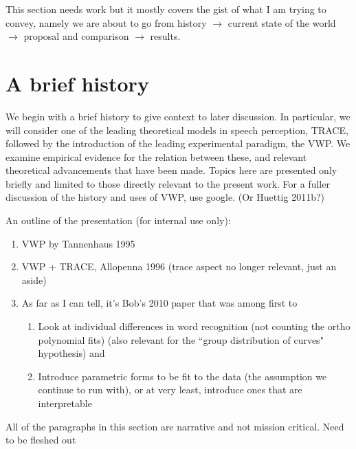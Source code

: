 This section needs work but it mostly covers the gist of what I am trying to convey, namely we are about to go from history $\rightarrow$ current state of the world $\rightarrow$ proposal and comparison $\rightarrow$ results.

\section{A brief history}
We begin with a brief history to give context to later discussion. In particular, we will consider one of the leading theoretical models in speech perception, TRACE, followed by the introduction of the leading experimental paradigm, the VWP. We examine empirical evidence for the relation between these, and relevant theoretical advancements that have been made. Topics here are presented only briefly and limited to those directly relevant to the present work. For a fuller discussion of the history and uses of VWP, use google. (Or Huettig 2011b?)

An outline of the presentation (for internal use only):

\begin{singlespace}
\begin{enumerate}
\vspace{-2mm}
\item VWP by Tannenhaus 1995 \cite{tanenhaus1995integration}
\item VWP + TRACE, Allopenna 1996 (trace aspect no longer relevant, just an aside) \cite{allopenna1998tracking}
\item As far as I can tell, it's Bob's 2010 paper that was among first to \cite{mcmurray2010individual}
\begin{enumerate}
\item Look at individual differences in word recognition (not counting the ortho polynomial fits) (also relevant for the ``group distribution of curves" hypothesis) and
\item Introduce parametric forms to be fit to the data (the assumption we continue to run with), or at very least, introduce ones that are interpretable
\end{enumerate}
\end{enumerate}
\end{singlespace}

All of the paragraphs in this section are narrative and not mission critical. Need to be fleshed out


